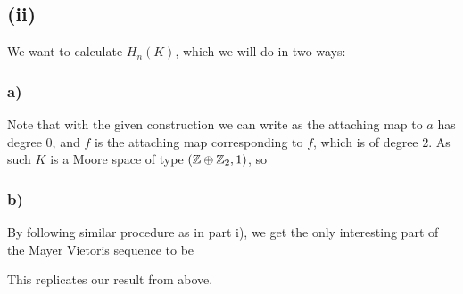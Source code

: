 \documentclass{article}
\begin{document}
\subsection{(ii)}
We want to calculate $H_n(K)$, which we will do in two ways:
\subsubsection{a)}
Note that with the given construction we can write 
as the attaching map to $a$ has degree 0, and $f$ is the attaching map corresponding to $f$, which is of degree 2. As such $K$ is a Moore space of type $(\mathbb{Z} \oplus \mathbb{Z}_2,1)$, so 

\subsubsection{b)}
By following similar procedure as in part i), we get the only interesting part of the Mayer Vietoris sequence to be 
\begin{center}
\end{center}

This replicates our result from above.
\end{document}
